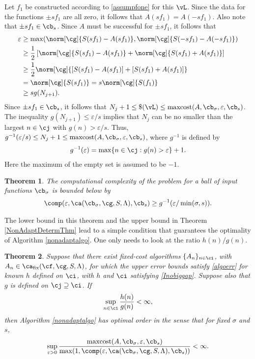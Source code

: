 \documentclass[]{elsarticle}
\DeclareMathOperator{\fix}{fix}
\DeclareMathOperator{\maxcost}{maxcost}
\newtheorem{theorem}{Theorem}
\theoremstyle{definition}
\theoremstyle{remark}
\begin{document}
Let $f_1$ be constructed according to \eqref{assumpfone} for this $\vL$.  Since the data for the functions $\pm s f_1$ are all zero, it follows that $A(s f_1)=A(-s f_1)$.  Also note that $\pm s f_1 \in \cb_{s}$.  Since $A$ must be successful for $\pm s f_1$, it follows that 
\begin{align*}
\varepsilon & \ge \max(\norm[\cg]{S(sf_1)-A(sf_1)},\norm[\cg]{S(-sf_1)-A(-sf_1)}) \\
& \ge \frac{1}{2} \left[ \norm[\cg]{S(sf_1)-A(sf_1)}+ \norm[\cg]{S(sf_1)+A(sf_1)} \right] \\
& \ge \frac{1}{2} \norm[\cg]{[S(sf_1)-A(sf_1)]+[S(sf_1)+A(sf_1)]} \\
& = \norm[\cg]{S(sf_1)}= s\norm[\cg]{S(f_1)}  \\
& \ge s g(N_{j+1}).
\end{align*}
Since $\pm s f_1 \in \cb_s$, it follows that $N_{j}+1 \le \$(\vL) \le \maxcost(A,\cb_{\sigma},\varepsilon,\cb_{s})$.  The inequality $g(N_{j+1}) \le \varepsilon/s$ implies that $N_{j}$ can be no smaller than the largest $n \in \cj$ with $g(n) > \varepsilon/s$.  Thus, $g^{-1}(\varepsilon/s) \le N_{j}+1 \le \maxcost(A,\cb_{\sigma},\varepsilon,\cb_{s})$, where $g^{-1}$ is defined by
\begin{equation*} \label{ginvdef}
g^{-1}(\varepsilon) = \max \{ n \in \cj : g(n) > \varepsilon\}+1.
\end{equation*}
Here the maximum of the empty set is assumed to be $-1$.

\begin{theorem} \label{complowbdball} The computational complexity of the problem for a ball of input functions $\cb_{\sigma}$ is bounded below by
\begin{equation*}
\comp(\varepsilon,\ca(\cb_{\sigma},\cg,S,\Lambda),\cb_s) \ge
g ^{-1}(\varepsilon/\min(\sigma,s)).
\end{equation*}
\end{theorem}

The lower bound in this theorem and the upper bound in Theorem \ref{NonAdaptDetermThm} lead to a simple condition that guarantees the optimality of Algorithm \ref{nonadaptalgo}.  One only needs to look at the ratio $h(n)/g(n)$.

\begin{theorem} \label{optimalprop} Suppose that there exist fixed-cost algorithms $\{A_n\}_{n \in \ci}$, with $A_n  \in \ca_{\fix}(\cf,\cg,S,\Lambda)$, for which the upper error bounds satisfy \eqref{algoerr} for known $h$ defined on $\ci$, with $h$ and $\ci$ satisfying \eqref{Inobiggap}.  Suppose also that $g$ is defined on $\cj \supseteq \ci$. If 
\begin{equation}\label{ghcond}
\sup_{n \in \ci} \frac{h(n)}{g(n)} < \infty,
\end{equation}
then Algorithm \ref{nonadaptalgo} has optimal order in the sense that for fixed $\sigma$ and $s$, 
\begin{equation*} \label{balloptresult}
\sup_{\varepsilon > 0} \frac{\maxcost(A,\cb_{\sigma},\varepsilon,\cb_{s})}
{\max(1,\comp(\varepsilon,\ca(\cb_{\sigma},\cg,S,\Lambda),\cb_s))} <\infty.
\end{equation*}
\end{theorem}
\end{document}
